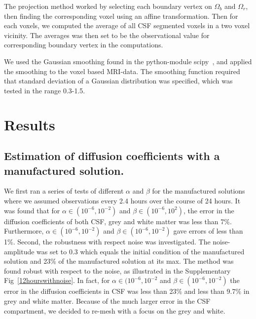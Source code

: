 \documentclass[12pt,a4paper]{article}
\newcommand{\kam}[1]{\textcolor{blue}{#1}}
\begin{document}
The projection method worked by selecting each boundary vertex on $\Omega_b$ and $\Omega_r$, then finding the corresponding voxel using an affine transformation. Then for each voxels, we  computed the average of all CSF segmented voxels in a two voxel vicinity. The averages was then set to be the observational value for corresponding boundary vertex in the computations.

We used the Gaussian smoothing found in the python-module scipy~\cite{jones2001scipy}, and applied the smoothing to the voxel based MRI-data. The smoothing function required that standard deviation of a Gaussian distribution was specified, which was tested in the range 0.3-1.5.






\section{Results}

\subsection{Estimation of diffusion coefficients with a manufactured solution.} 
We first ran a series of tests of different $\alpha$ and $\beta$ for the manufactured solutions where we assumed observations every 2.4 hours
over the course of 24 hours. It was found that for $\alpha \in (10^{-6}, 10^{-2})$ and $\beta\in(10^{-6}, 10^2)$, the error in 
the diffusion coefficients of both CSF, grey and white matter was less than 7\%. Furthermore,  
$\alpha \in (10^{-6}, 10^{-2})$ and $\beta\in(10^{-6}, 10^{-2})$ gave errors of less than 1\%. Second, the robustness with respect noise
was investigated. The noise-amplitude was set to 0.3 which equals the initial condition of the manufactured solution
and 23\% of the manufactured solution at its max. The method was found robust with respect to the noise, as illustrated in the Supplementary Fig~\ref{12hourswithnoise}.  In fact, for  $\alpha \in (10^{-6}, 10^{-2}$ and $\beta\in(10^{-6}, 10^{-2})$ the error in the diffusion coefficients in CSF was less than 23\% and less than 9.7\% in grey and white matter. Because of the much larger 
error in the CSF compartment, we decided to re-mesh with a focus on the grey and white.
 
\end{document}
